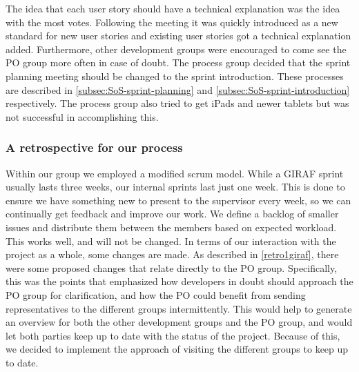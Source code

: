 The idea that each user story should have a technical explanation was the idea with the most votes. 
Following the meeting it was quickly introduced as a new standard for new user stories and existing user stories got a technical explanation added.
Furthermore, other development groups were encouraged to come see the PO group more often in case of doubt.
The process group decided that the sprint planning meeting should be changed to the sprint introduction.
These processes are described in \autoref{subsec:SoS-sprint-planning} and \autoref{subsec:SoS-sprint-introduction} respectively.
The process group also tried to get iPads and newer tablets but was not successful in accomplishing this.

\subsubsection{A retrospective for our process}
Within our group we employed a modified scrum model.
While a GIRAF sprint usually lasts three weeks, our internal sprints last just one week.
This is done to ensure we have something new to present to the supervisor every week, so we can continually get feedback and improve our work.
We define a backlog of smaller issues and distribute them between the members based on expected workload.
This works well, and will not be changed.
In terms of our interaction with the project as a whole, some changes are made.
As described in \autoref{retro1giraf}, there were some proposed changes that relate directly to the PO group.
Specifically, this was the points that emphasized how developers in doubt should approach the PO group for clarification, and how the PO could benefit from sending representatives to the different groups intermittently. 
This would help to generate an overview for both the other development groups and the PO group, and would let both parties keep up to date with the status of the project.
Because of this, we decided to implement the approach of visiting the different groups to keep up to date.